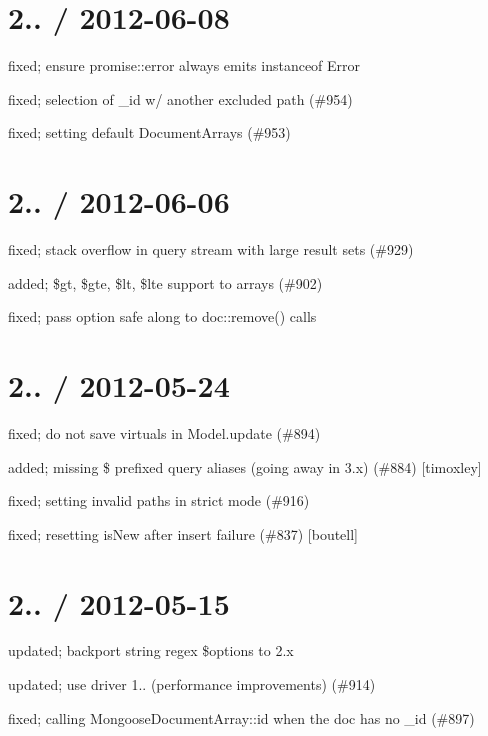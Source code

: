 \section*{2.. / 2012-\/06-\/08 }


\begin{DoxyItemize}
\item fixed; ensure promise\+::error always emits instanceof Error
\item fixed; selection of \+\_\+id w/ another excluded path (\#954)
\item fixed; setting default Document\+Arrays (\#953)
\end{DoxyItemize}

\section*{2.. / 2012-\/06-\/06 }


\begin{DoxyItemize}
\item fixed; stack overflow in query stream with large result sets (\#929)
\item added; \$gt, \$gte, \$lt, \$lte support to arrays (\#902)
\item fixed; pass option {\ttfamily safe} along to doc\+::remove() calls
\end{DoxyItemize}

\section*{2.. / 2012-\/05-\/24 }


\begin{DoxyItemize}
\item fixed; do not save virtuals in Model.\+update (\#894)
\item added; missing \$ prefixed query aliases (going away in 3.\+x) (\#884) \mbox{[}timoxley\mbox{]}
\item fixed; setting invalid paths in strict mode (\#916)
\item fixed; resetting is\+New after insert failure (\#837) \mbox{[}boutell\mbox{]}
\end{DoxyItemize}

\section*{2.. / 2012-\/05-\/15 }


\begin{DoxyItemize}
\item updated; backport string regex \$options to 2.\+x
\item updated; use driver 1.. (performance improvements) (\#914)
\item fixed; calling Mongoose\+Document\+Array\+::id when the doc has no \+\_\+id (\#897)
\end{DoxyItemize}

